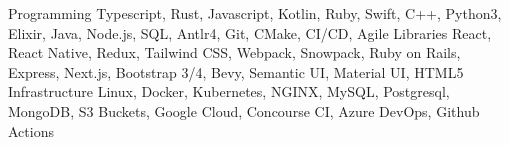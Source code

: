 \begin{cvskills}
  \cvskill
    {Programming}
    {Typescript, Rust, Javascript, Kotlin, Ruby, Swift, C++, Python3, Elixir, Java, Node.js, SQL, Antlr4, Git, CMake, CI/CD, Agile}
  \cvskill
    {Libraries}
    {React, React Native, Redux, Tailwind CSS, Webpack, Snowpack, Ruby on Rails, Express, Next.js, Bootstrap 3/4, Bevy, Semantic UI, Material UI, HTML5}
  \cvskill
    {Infrastructure}
    {Linux, Docker, Kubernetes, NGINX, MySQL, Postgresql, MongoDB, S3 Buckets, Google Cloud, Concourse CI, Azure DevOps, Github Actions}
\end{cvskills}
